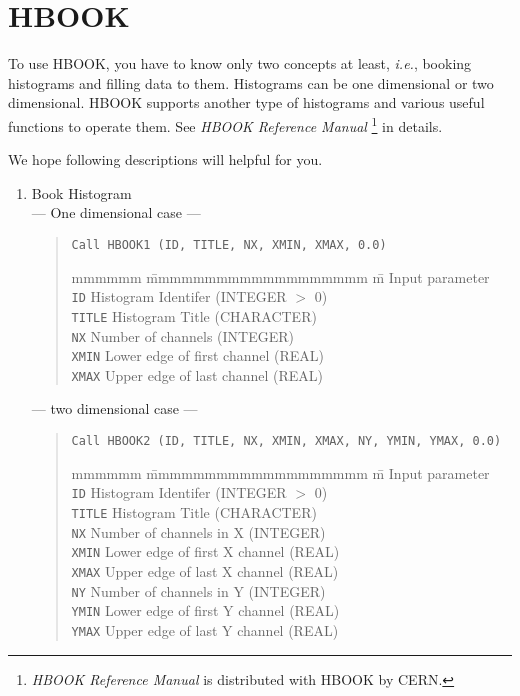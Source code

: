 \chapter{HBOOK}\label{chap:HBOOK}

To use HBOOK,
you have to know only two concepts at least,
{\em i.e.},
booking histograms and filling data to them.
Histograms can be one dimensional or two dimensional.
HBOOK supports another type of histograms
and various useful functions to operate them.
See {\em HBOOK Reference Manual} \footnote
{{\em HBOOK Reference Manual} is distributed with HBOOK by CERN.}
in details.

We hope following descriptions will helpful for you.

\begin{enumerate}

\item Book Histogram \\
--- One dimensional case ---
\begin{quote}
\baselineskip 3.2mm\begin{verbatim}
Call HBOOK1 (ID, TITLE, NX, XMIN, XMAX, 0.0)
\end{verbatim}
\begin{tabbing} mmmmmm \= mmmmmmmmmmmmmmmmmmm \= m \kill
Input parameter \\
{\tt ID}	\> Histogram Identifer		\> (INTEGER $>$ 0) \\
{\tt TITLE}	\> Histogram Title		\> (CHARACTER) \\
{\tt NX}	\> Number of channels		\> (INTEGER) \\
{\tt XMIN}	\> Lower edge of first channel	\> (REAL) \\
{\tt XMAX}	\> Upper edge of last channel	\> (REAL)
\end {tabbing}
\end{quote}

--- two dimensional case ---

\begin{quote}
\baselineskip 3.2mm\begin{verbatim}
Call HBOOK2 (ID, TITLE, NX, XMIN, XMAX, NY, YMIN, YMAX, 0.0)
\end{verbatim}
\begin{tabbing} mmmmmm \= mmmmmmmmmmmmmmmmmmm \= m \kill
Input parameter \\
{\tt ID}	\> Histogram Identifer			\> (INTEGER $>$ 0) \\
{\tt TITLE}	\> Histogram Title			\> (CHARACTER) \\
{\tt NX}	\> Number of channels in X		\> (INTEGER) \\
{\tt XMIN}	\> Lower edge of first X channel	\> (REAL) \\
{\tt XMAX}	\> Upper edge of last X channel		\> (REAL) \\
{\tt NY}	\> Number of channels in Y		\> (INTEGER) \\
{\tt YMIN}	\> Lower edge of first Y channel	\> (REAL) \\
{\tt YMAX}	\> Upper edge of last Y channel		\> (REAL)
\end {tabbing}
\end{quote}


\end{enumerate}

